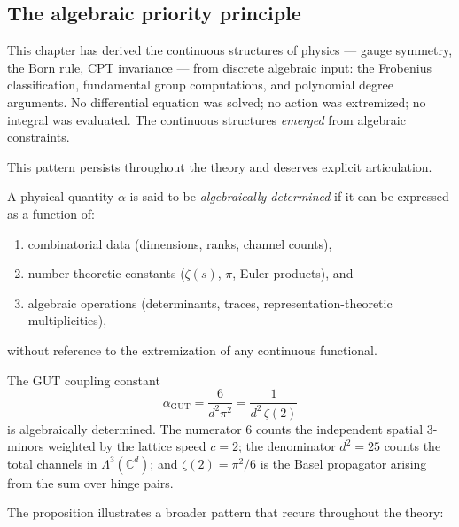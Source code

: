 \subsection{The algebraic priority principle}
\label{sec:algebraic_priority}

This chapter has derived the continuous structures of physics --- gauge symmetry, the Born rule, CPT invariance --- from discrete algebraic input: the Frobenius classification, fundamental group computations, and polynomial degree arguments. No differential equation was solved; no action was extremized; no integral was evaluated. The continuous structures \emph{emerged} from algebraic constraints.

This pattern persists throughout the theory and deserves explicit articulation.

\begin{definition}
\label{def:algebraic_priority}
A physical quantity $\alpha$ is said to be \emph{algebraically determined} if it can be expressed as a function of:
\begin{enumerate}
\item combinatorial data (dimensions, ranks, channel counts),
\item number-theoretic constants ($\zeta(s)$, $\pi$, Euler products), and
\item algebraic operations (determinants, traces, representation-theoretic multiplicities),
\end{enumerate}
without reference to the extremization of any continuous functional.
\end{definition}

\begin{proposition}
\label{prop:alpha_algebraic}
The GUT coupling constant
\begin{equation}
\alpha_{\mathrm{GUT}} = \frac{6}{d^2 \pi^2} = \frac{1}{d^2\,\zeta(2)}
\end{equation}
is algebraically determined. The numerator $6$ counts the independent spatial $3$-minors weighted by the lattice speed $c = 2$; the denominator $d^2 = 25$ counts the total channels in $\Lambda^3(\mathbb{C}^d)$; and $\zeta(2) = \pi^2/6$ is the Basel propagator arising from the sum over hinge pairs.
\end{proposition}

The proposition illustrates a broader pattern that recurs throughout the theory:

